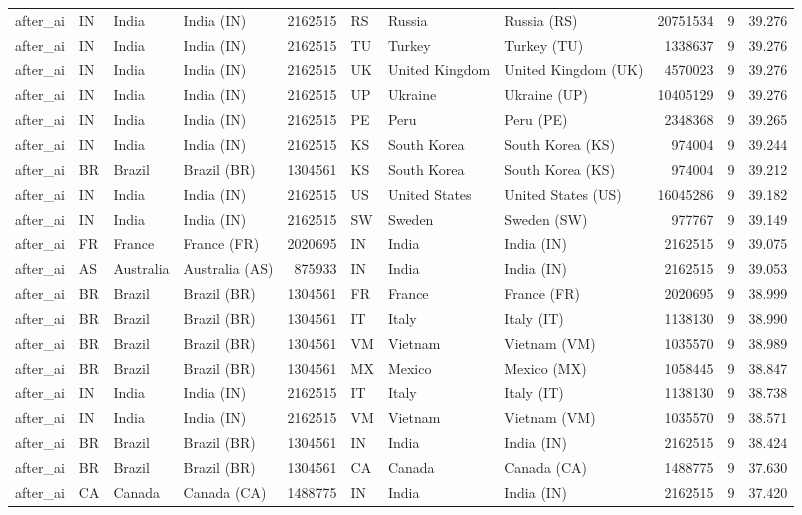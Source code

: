 \begin{tabular}{llllrlllrrr}
after\_ai & IN & India & India (IN) & 2162515 & RS & Russia & Russia (RS) & 20751534 & 9 & 39.276 \\
after\_ai & IN & India & India (IN) & 2162515 & TU & Turkey & Turkey (TU) & 1338637 & 9 & 39.276 \\
after\_ai & IN & India & India (IN) & 2162515 & UK & United Kingdom & United Kingdom (UK) & 4570023 & 9 & 39.276 \\
after\_ai & IN & India & India (IN) & 2162515 & UP & Ukraine & Ukraine (UP) & 10405129 & 9 & 39.276 \\
after\_ai & IN & India & India (IN) & 2162515 & PE & Peru & Peru (PE) & 2348368 & 9 & 39.265 \\
after\_ai & IN & India & India (IN) & 2162515 & KS & South Korea & South Korea (KS) & 974004 & 9 & 39.244 \\
after\_ai & BR & Brazil & Brazil (BR) & 1304561 & KS & South Korea & South Korea (KS) & 974004 & 9 & 39.212 \\
after\_ai & IN & India & India (IN) & 2162515 & US & United States & United States (US) & 16045286 & 9 & 39.182 \\
after\_ai & IN & India & India (IN) & 2162515 & SW & Sweden & Sweden (SW) & 977767 & 9 & 39.149 \\
after\_ai & FR & France & France (FR) & 2020695 & IN & India & India (IN) & 2162515 & 9 & 39.075 \\
after\_ai & AS & Australia & Australia (AS) & 875933 & IN & India & India (IN) & 2162515 & 9 & 39.053 \\
after\_ai & BR & Brazil & Brazil (BR) & 1304561 & FR & France & France (FR) & 2020695 & 9 & 38.999 \\
after\_ai & BR & Brazil & Brazil (BR) & 1304561 & IT & Italy & Italy (IT) & 1138130 & 9 & 38.990 \\
after\_ai & BR & Brazil & Brazil (BR) & 1304561 & VM & Vietnam & Vietnam (VM) & 1035570 & 9 & 38.989 \\
after\_ai & BR & Brazil & Brazil (BR) & 1304561 & MX & Mexico & Mexico (MX) & 1058445 & 9 & 38.847 \\
after\_ai & IN & India & India (IN) & 2162515 & IT & Italy & Italy (IT) & 1138130 & 9 & 38.738 \\
after\_ai & IN & India & India (IN) & 2162515 & VM & Vietnam & Vietnam (VM) & 1035570 & 9 & 38.571 \\
after\_ai & BR & Brazil & Brazil (BR) & 1304561 & IN & India & India (IN) & 2162515 & 9 & 38.424 \\
after\_ai & BR & Brazil & Brazil (BR) & 1304561 & CA & Canada & Canada (CA) & 1488775 & 9 & 37.630 \\
after\_ai & CA & Canada & Canada (CA) & 1488775 & IN & India & India (IN) & 2162515 & 9 & 37.420 \\
\bottomrule
\end{tabular}
